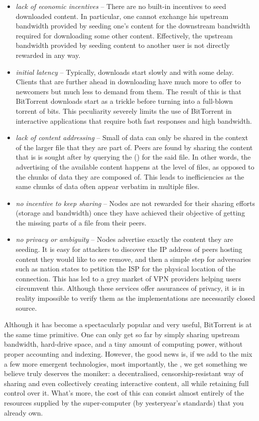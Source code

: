 \begin{itemize}
\item \emph{lack of economic incentives} -- 
There are no built-in incentives to seed downloaded content. In particular, one cannot exchange his upstream bandwidth provided by seeding one's content for the downstream bandwidth required for downloading some other content. Effectively, the upstream bandwidth provided by seeding content to another user is not directly rewarded in any way.
\item \emph{initial latency} -- 
 Typically, downloads start slowly and with some delay. Clients that are further ahead in downloading have much more to offer to newcomers but much less to demand from them. The result of this is that BitTorrent downloads start as a trickle before turning into a full-blown torrent of bits. This peculiarity severely limits the use of BitTorrent in interactive applications that require both fast responses and high bandwidth.
\item \emph{lack of content addressing} -- Small  of data can only be shared in the context of the larger file that they are part of. Peers are found by sharing the content that is is sought after by querying the  () for the said file. In other words, the advertising of the available content happens at the level of files, as opposed to the chunks of data they are composed of. This leads to inefficiencies as the same chunks of data often appear verbatim in multiple files. 
\item \emph{no incentive to keep sharing} --
Nodes are not rewarded for their sharing efforts (storage and bandwidth) once they have achieved their objective of getting the missing parts of a file from their peers.
\item \emph{no privacy or ambiguity} --
Nodes advertise exactly the content they are seeding. It is easy for attackers to discover the IP address of peers hosting content they would like to see remove, and then a simple step for adversaries such as nation states to petition the ISP for the physical location of the connection. This has led to a grey market of VPN providers helping users circumvent this. Although these services offer assurances of privacy, it is in reality impossible to verify them as the implementations are necessarily closed source.
\end{itemize}

Although it has become a spectacularly popular and very useful, BitTorrent is at the same time primitive. One can only get so far by simply sharing upstream bandwidth, hard-drive space, and a tiny amount of computing power, without proper accounting and indexing. However, the good news is, if we add to the mix a few more emergent technologies, most importantly, the , we get something we believe truly deserves the  moniker: a decentralised, censorship-resistant way of sharing and even collectively creating interactive content, all while retaining full control over it. What's more, the cost of this can consist almost entirely of the resources supplied by the super-computer (by yesteryear's standards) that you already own.

